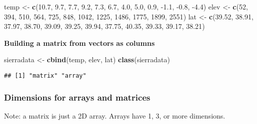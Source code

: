 \documentclass[
]{book}
\newenvironment{Shaded}{\begin{snugshade}}{\end{snugshade}}
\newcommand{\DecValTok}[1]{\textcolor[rgb]{0.00,0.00,0.81}{#1}}
\newcommand{\FloatTok}[1]{\textcolor[rgb]{0.00,0.00,0.81}{#1}}
\newcommand{\KeywordTok}[1]{\textcolor[rgb]{0.13,0.29,0.53}{\textbf{#1}}}
\newcommand{\NormalTok}[1]{#1}
\newcommand{\StringTok}[1]{\textcolor[rgb]{0.31,0.60,0.02}{#1}}
\begin{document}
\begin{Shaded}
\begin{Highlighting}[]
\NormalTok{temp <-}\StringTok{ }\KeywordTok{c}\NormalTok{(}\FloatTok{10.7}\NormalTok{, }\FloatTok{9.7}\NormalTok{, }\FloatTok{7.7}\NormalTok{, }\FloatTok{9.2}\NormalTok{, }\FloatTok{7.3}\NormalTok{, }\FloatTok{6.7}\NormalTok{, }\FloatTok{4.0}\NormalTok{, }\FloatTok{5.0}\NormalTok{, }\FloatTok{0.9}\NormalTok{, }\FloatTok{-1.1}\NormalTok{, }\FloatTok{-0.8}\NormalTok{, }\FloatTok{-4.4}\NormalTok{)}
\NormalTok{elev <-}\StringTok{ }\KeywordTok{c}\NormalTok{(}\DecValTok{52}\NormalTok{, }\DecValTok{394}\NormalTok{, }\DecValTok{510}\NormalTok{, }\DecValTok{564}\NormalTok{, }\DecValTok{725}\NormalTok{, }\DecValTok{848}\NormalTok{, }\DecValTok{1042}\NormalTok{, }\DecValTok{1225}\NormalTok{, }\DecValTok{1486}\NormalTok{, }\DecValTok{1775}\NormalTok{, }\DecValTok{1899}\NormalTok{, }\DecValTok{2551}\NormalTok{)}
\NormalTok{lat <-}\StringTok{ }\KeywordTok{c}\NormalTok{(}\FloatTok{39.52}\NormalTok{, }\FloatTok{38.91}\NormalTok{, }\FloatTok{37.97}\NormalTok{, }\FloatTok{38.70}\NormalTok{, }\FloatTok{39.09}\NormalTok{, }\FloatTok{39.25}\NormalTok{, }\FloatTok{39.94}\NormalTok{, }\FloatTok{37.75}\NormalTok{, }\FloatTok{40.35}\NormalTok{, }\FloatTok{39.33}\NormalTok{, }\FloatTok{39.17}\NormalTok{, }\FloatTok{38.21}\NormalTok{)}
\end{Highlighting}
\end{Shaded}

\textbf{Building a matrix from vectors as columns}

\begin{Shaded}
\begin{Highlighting}[]
\NormalTok{sierradata <-}\StringTok{ }\KeywordTok{cbind}\NormalTok{(temp, elev, lat)}
\KeywordTok{class}\NormalTok{(sierradata)}
\end{Highlighting}
\end{Shaded}

\begin{verbatim}
## [1] "matrix" "array"
\end{verbatim}

\hypertarget{dimensions-for-arrays-and-matrices}{%
\subsubsection{Dimensions for arrays and matrices}\label{dimensions-for-arrays-and-matrices}}

Note: a matrix is just a 2D array. Arrays have 1, 3, or more dimensions.
\end{document}

